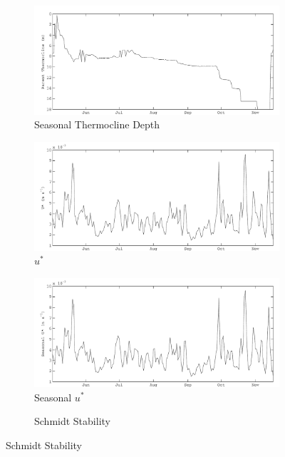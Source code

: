 \begin{figure}
		\begin{subfigure}{\lafigsize}
			\caption{\label{fig:la:out:SthermD}Seasonal Thermocline Depth}
			\includegraphics[width=\textwidth]{figures/Sparkling_SthermD.pdf}
		\end{subfigure}
		\begin{subfigure}{\lafigsize}
			\caption{\label{fig:la:out:uSt}$u^{*}$}
			\includegraphics[width=\textwidth]{figures/Sparkling_uSt.pdf}
		\end{subfigure}
		\begin{subfigure}{\lafigsize}
			\caption{\label{fig:la:out:SuSt}Seasonal $u^{*}$}
			\includegraphics[width=\textwidth]{figures/Sparkling_SuSt.pdf}
		\end{subfigure}
		\begin{subfigure}{\lafigsize}
			\caption{\label{fig:la:out:St}Schmidt Stability}

\end{subfigure}
\end{figure}
